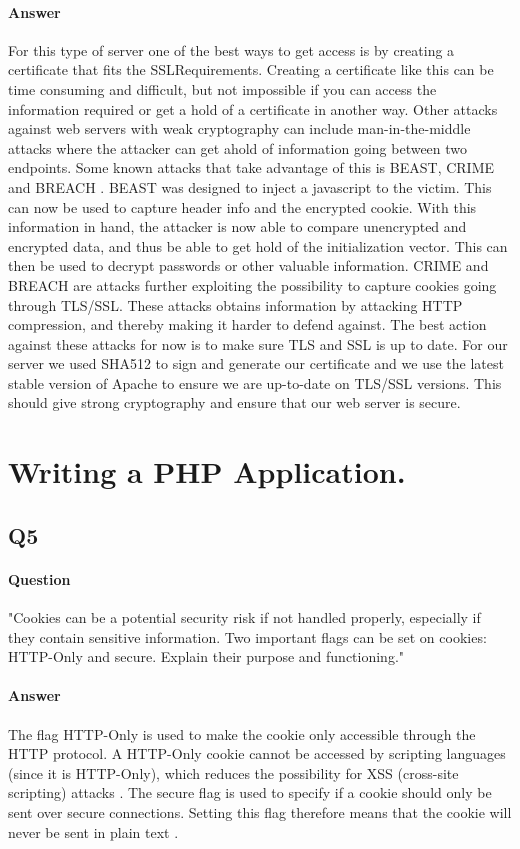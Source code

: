 \documentclass[11pt, a4paper]{article}
\begin{document}
\paragraph{Answer}
For this type of server one of the best ways to get access is by creating a certificate that fits the SSLRequirements. Creating a certificate like this can be time consuming and difficult, but not impossible if you can access the information required or get a hold of a certificate in another way.
Other attacks against web servers with weak cryptography can include man-in-the-middle attacks where the attacker can get ahold of information going between two endpoints. Some known attacks that take advantage of this is BEAST, CRIME and BREACH \cite{cisco}. BEAST was designed to inject a javascript to the victim. This can now be used to capture header info and the encrypted cookie. With this information in hand, the attacker is now able to compare unencrypted and encrypted data, and thus be able to get hold of the initialization vector. This can then be used to decrypt passwords or other valuable information\cite{context}. CRIME and BREACH are attacks further exploiting the possibility to capture cookies going through TLS/SSL. These attacks obtains information by attacking HTTP compression, and thereby making it harder to defend against\cite{iSEC}. The best action against these attacks for now is to make sure TLS and SSL is up to date.
For our server we used SHA512 to sign and generate our certificate and we use the latest stable version of Apache to ensure we are up-to-date on TLS/SSL versions. This should give strong cryptography and ensure that our web server is secure.
\section{Writing a PHP Application.}
\subsection{Q5}
\paragraph{Question}
"Cookies can be a potential security risk if not handled properly, especially if they contain
sensitive information. Two important flags can be set on cookies: HTTP-Only and secure.
Explain their purpose and functioning."
\paragraph{Answer}
The flag HTTP-Only is used to make the cookie only accessible through the HTTP protocol. A HTTP-Only cookie cannot be accessed by scripting languages (since it is HTTP-Only), which reduces the possibility for XSS (cross-site scripting) attacks \cite{cookie-http}.
The secure flag is used to specify if a cookie should only be sent over secure connections. Setting this flag therefore means that the cookie will never be sent in plain text \cite{cookie-secure}.
\end{document}
